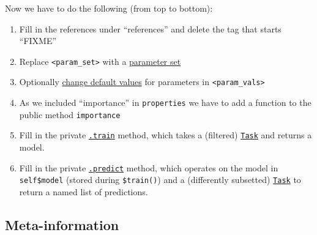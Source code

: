 \documentclass[
]{scrbook}
\newenvironment{Shaded}{\begin{snugshade}}{\end{snugshade}}
\newcommand{\AlertTok}[1]{\textcolor[rgb]{0.94,0.16,0.16}{#1}}
\newcommand{\AttributeTok}[1]{\textcolor[rgb]{0.77,0.63,0.00}{#1}}
\newcommand{\CommentTok}[1]{\textcolor[rgb]{0.56,0.35,0.01}{\textit{#1}}}
\newcommand{\FunctionTok}[1]{\textcolor[rgb]{0.00,0.00,0.00}{#1}}
\newcommand{\NormalTok}[1]{#1}
\newcommand{\OtherTok}[1]{\textcolor[rgb]{0.56,0.35,0.01}{#1}}
\newcommand{\SpecialCharTok}[1]{\textcolor[rgb]{0.00,0.00,0.00}{#1}}
\newcommand{\StringTok}[1]{\textcolor[rgb]{0.31,0.60,0.02}{#1}}
\providecommand{\tightlist}{%
  \setlength{\itemsep}{0pt}\setlength{\parskip}{0pt}}
\renewenvironment{Shaded} {\begin{snugshade}\small} {\end{snugshade}}
\begin{document}
\begin{Shaded}
\end{Shaded}

Now we have to do the following (from top to bottom):

\begin{enumerate}
\def\labelenumi{\arabic{enumi}.}
\tightlist
\item
  Fill in the references under ``references'' and delete the tag that starts ``FIXME''
\item
  Replace \texttt{\textless{}param\_set\textgreater{}} with a \protect\hyperlink{param-set}{parameter set}
\item
  Optionally \protect\hyperlink{param-set}{change default values} for parameters in \texttt{\textless{}param\_vals\textgreater{}}
\item
  As we included ``importance'' in \texttt{properties} we have to add a function to the public method \texttt{importance}
\item
  Fill in the private \protect\hyperlink{learner-train}{\texttt{.train}} method, which takes a (filtered) \href{https://mlr3.mlr-org.com/reference/Task.html}{\texttt{Task}} and returns a model.
\item
  Fill in the private \protect\hyperlink{learner-predict}{\texttt{.predict}} method, which operates on the model in \texttt{self\$model} (stored during \texttt{\$train()}) and a (differently subsetted) \href{https://mlr3.mlr-org.com/reference/Task.html}{\texttt{Task}} to return a named list of predictions.
\end{enumerate}

\hypertarget{learner-meta-information}{%
\subsection{Meta-information}\label{learner-meta-information}}
\end{document}

